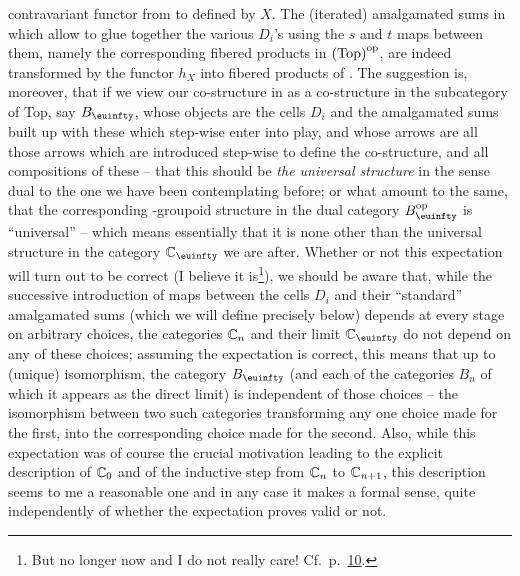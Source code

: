 contravariant functor from \cTop{} to \Sets{} defined by $X$. The
(iterated) amalgamated sums in \cTop{} which allow to glue together the
various $D_i$'s using the $s$ and $t$ maps between them, namely the
corresponding fibered products in ${(\mathrm{Top})}^{\mathrm{op}}$, are indeed
transformed by the functor $h_X$ into fibered products of \Sets.
The suggestion is, moreover, that if we view our co-structure in \cTop{}
as a co-structure in the subcategory of Top, say $B_\oo$, whose
objects are the cells $D_i$ and the amalgamated sums built up with
these which step-wise enter into play, and whose arrows are all those
arrows which are introduced step-wise to define the co-structure, and
all compositions of these -- that this should be \emph{the universal
  structure} in the sense dual to the one we have been contemplating
before; or what amount to the same, that the corresponding
\oo-groupoid structure in the dual category $B_\oo\op$ is
``universal'' -- which means essentially that it is none other than
the universal structure in the category $\bC_\oo$ we are
after. Whether or not this expectation will turn out to be correct (I
believe it is\footnote{ But no longer now and I do not really
  care! Cf.\ p.\ \hyperref[p:L.10]{10}.}), we should be aware that, while the successive
introduction of maps between the cells $D_i$ and their ``standard''
amalgamated sums (which we will define precisely below) depends at
every stage on arbitrary choices, the categories ${\mathbb{C}}_n$ and their
limit $\bC_\oo$ do not depend on any of these choices; assuming the
expectation is correct, this means that up to (unique) isomorphism,
the category $B_\oo$ (and each of the categories $B_n$ of which it
appears as the direct limit) is independent of those choices -- the
isomorphism between two such categories transforming any one choice
made for the first, into the corresponding choice made for the
second. Also, while this expectation was of course the crucial
motivation leading to the explicit description of ${\mathbb{C}}_0$ and of
the inductive step from ${\mathbb{C}}_n$ to ${\mathbb{C}}_{n+1}$, this description
seems to me a reasonable one and in any case it makes a formal sense,
quite independently of whether the expectation proves valid or not.

